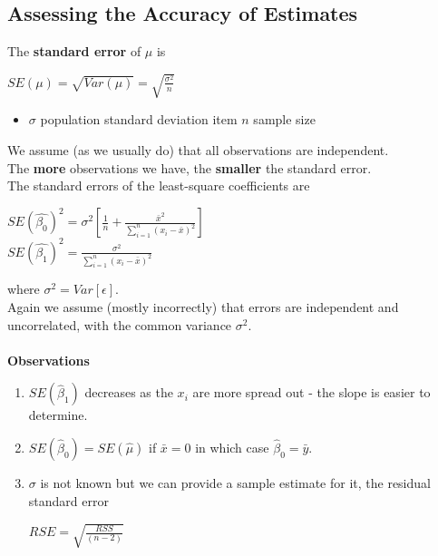 		\subsection{Assessing the Accuracy of Estimates}
			The \textbf{standard error} of $\mu$ is
			\begin{center}
				$SE(\mu) = \sqrt{Var(\mu)} = \sqrt{\frac{\sigma^2}{n}}$
			\end{center}
			\begin{itemize}
				\item $\sigma$ population standard deviation
				item $n$ sample size
			\end{itemize}
			We assume (as we usually do) that all observations are independent.\\
			The \textbf{more} observations we have, the \textbf{smaller} the standard error.\\
			The standard errors of the least-square coefficients are
			\begin{center}
				$SE(\hat{\beta_0})^2 = \sigma^2 \left[\frac{1}{n} + \frac{\bar{x}^2}{\sum\limits_{i=1}^n (x_i - \bar{x})^2}\right]$\\
				$SE(\hat{\beta_1})^2 = \frac{\sigma^2}{\sum\limits_{i=1}^n (x_i - \bar{x})^2}$
			\end{center}
			where $\sigma^2 = Var[\epsilon]$.\\
			Again we assume (mostly incorrectly) that errors are independent and uncorrelated, with the common variance $\sigma^2$.\\\\
			\textbf{Observations}
			\begin{enumerate}
				\item $SE(\hat{\beta}_1)$ decreases as the $x_i$ are more spread out - the slope is easier to determine.
				\item $SE(\hat{\beta}_0) = SE(\hat{\mu})$ if $\bar{x} = 0$ in which case $\hat{\beta}_0 = \bar{y}$.
				\item $\sigma$ is not known but we can provide a sample estimate for it, the residual standard error
					\begin{center}
						$RSE = \sqrt{\frac{RSS}{(n-2)}}$
					\end{center}
			\end{enumerate}
			
\newpage

